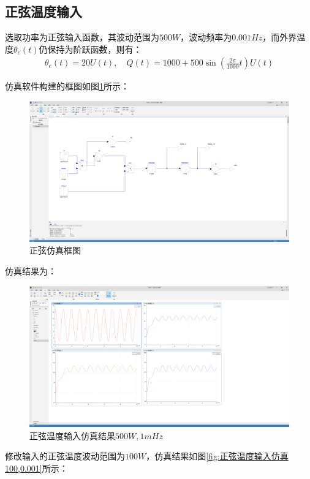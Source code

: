 \documentclass[11pt]{article}
\begin{document}
\subsection{正弦温度输入}
选取功率为正弦输入函数，其波动范围为$500\unit{W}$，波动频率为$0.001\unit{Hz}$，而外界温度$\theta_e(t)$仍保持为阶跃函数，则有：
\begin{align*}
  \theta_e(t)=20U(t),\quad Q(t)=1000+500\sin(\frac{2\pi}{1000}t)U(t)
\end{align*}\par
仿真软件构建的框图如图\ref{fig:正弦仿真框图}所示：
\begin{figure}[H]
  \centering
  \includegraphics[width=1.0\textwidth]{正弦仿真框图.png}
  \caption{正弦仿真框图}
  \label{fig:正弦仿真框图}
\end{figure}
仿真结果为：
\begin{figure}[H]
  \centering
  \includegraphics[width=1.0\textwidth]{正弦温度输入仿真50,0.001.png}
  \caption{正弦温度输入仿真结果$500\unit{W},1\unit{mHz}$}
  \label{fig:正弦温度输入仿真50,0.001}
\end{figure}
修改输入的正弦温度波动范围为$100\unit{W}$，仿真结果如图\ref{fig:正弦温度输入仿真100,0.001}所示：
\end{document}
